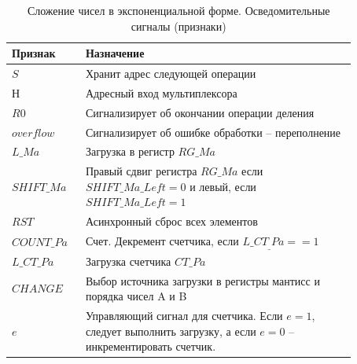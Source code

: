 \documentclass[a4paper,14pt]{extarticle}
\begin{document}
\begin{table}[h!]
	\centering
	\small
	\begin{tabular}{|m{0.17\linewidth}|m{0.7\linewidth}|}
		\hline
		\textbf{Признак} & \textbf{Назначение} \\ \hline
		$S$ & Хранит адрес следующей операции \\ \hline
		$Н$ & Адресный вход мультиплексора \\ \hline
		$R0$ & Сигнализирует об окончании операции деления \\ \hline
		$overflow$ & Сигнализирует об ошибке обработки -- переполнение \\ \hline
		$L\_Ma$ & Загрузка в регистр $RG\_Ma$ \\ \hline
		$SHIFT\_Ma$ & Правый сдвиг регистра $RG\_Ma$ если $SHIFT\_Ma\_Left=0$ и левый, если  $SHIFT\_Ma\_Left=1$ \\ \hline
		$RST$ & Асинхронный сброс всех элементов \\ \hline
		$COUNT\_Pa$ & Счет. Декремент счетчика, если $L\_CT_\_Pa==1$ \\ \hline
		$L\_CT\_Pa$ & Загрузка счетчика $CT\_Pa$ \\ \hline
		$CHANGE$ & Выбор источника загрузки в регистры мантисс и порядка чисел A и B \\ \hline
		$e$ & Управляющий сигнал для счетчика. Если $e=1$, следует выполнить загрузку, а если $e=0$ -- инкрементировать счетчик. \\ \hline
	\end{tabular}
	\caption{Сложение чисел в экспоненциальной форме. Осведомительные сигналы (признаки)}
	\label{tab:signalsop2}
\end{table}
\end{document}

